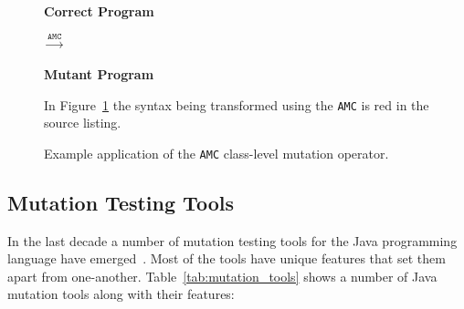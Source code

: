 \begin{figure}[h]
  \centering
  \begin{minipage}{6.5cm}
  \centering
  \footnotesize{\textbf{Correct Program}}
  
  \end{minipage}
  $\xrightarrow{\texttt{AMC}}$
  \begin{minipage}{6.5cm}
  \centering
  \footnotesize{\textbf{Mutant Program}}
  
  \end{minipage}
  \caption{Example application of the \texttt{AMC} class-level mutation operator.}
  \vspace{1mm}
  \footnotesize{In Figure~\ref{fig:AMC_mutation} the syntax being transformed using the \texttt{AMC} is red in the source listing.}
  \vspace{1mm}
  \label{fig:AMC_mutation}
\end{figure}


\subsection{Mutation Testing Tools}
\label{subsec:background_mutation_tools}
In the last decade a number of mutation testing tools for the Java programming language have emerged~\cite{JH10}. Most of the tools have unique features that set them apart from one-another. Table~\ref{tab:mutation_tools} shows a number of Java mutation tools along with their features:

